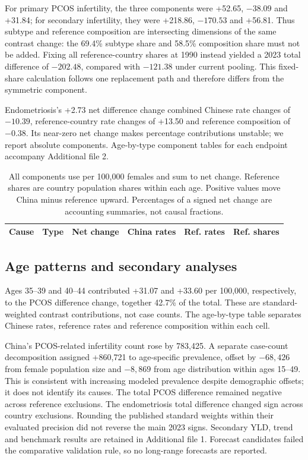 \documentclass[11pt,a4paper]{article}
\begin{document}
For primary PCOS infertility, the three components were +52.65, $-38.09$ and +31.84; for secondary infertility, they were +218.86, $-170.53$ and +56.81. Thus subtype and reference composition are intersecting dimensions of the same contrast change: the 69.4\% subtype share and 58.5\% composition share must not be added. Fixing all reference-country shares at 1990 instead yielded a 2023 total difference of $-202.48$, compared with $-121.38$ under current pooling. This fixed-share calculation follows one replacement path and therefore differs from the symmetric component.

Endometriosis's +2.73 net difference change combined Chinese rate changes of $-10.39$, reference-country rate changes of +13.50 and reference composition of $-0.38$. Its near-zero net change makes percentage contributions unstable; we report absolute components. Age-by-type component tables for each endpoint accompany Additional file 2.

\begin{table}[htbp]\centering\small{}
\caption{Symmetric decomposition of changes in standardized differences, 1990--2023.}\label{tab:composition}
\setlength{\tabcolsep}{3pt}
\begin{tabular}{llrrrr}\toprule
Cause & Type & Net change & China rates & Ref. rates & Ref. shares\\\midrule
\end{tabular}
\caption*{All components use per 100,000 females and sum to net change. Reference shares are country population shares within each age. Positive values move China minus reference upward. Percentages of a signed net change are accounting summaries, not causal fractions.}
\end{table}

\subsection{Age patterns and secondary analyses}
Ages 35--39 and 40--44 contributed +31.07 and +33.60 per 100,000, respectively, to the PCOS difference change, together 42.7\% of the total. These are standard-weighted contrast contributions, not case counts. The age-by-type table separates Chinese rates, reference rates and reference composition within each cell.

China's PCOS-related infertility count rose by 783,425. A separate case-count decomposition assigned +860,721 to age-specific prevalence, offset by $-68,426$ from female population size and $-8,869$ from age distribution within ages 15--49. This is consistent with increasing modeled prevalence despite demographic offsets; it does not identify its causes. The total PCOS difference remained negative across reference exclusions. The endometriosis total difference changed sign across country exclusions. Rounding the published standard weights within their evaluated precision did not reverse the main 2023 signs. Secondary YLD, trend and benchmark results are retained in Additional file 1. Forecast candidates failed the comparative validation rule, so no long-range forecasts are reported.
\end{document}
